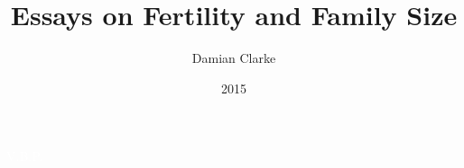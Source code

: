 \documentclass{report}[12pt]
\title{\textbf{Essays on Fertility and Family Size}}
\author{Damian Clarke}
\date{2015}
\begin{document}
\begin{spacing}{1.2}
\maketitle
\end{spacing}

\begin{spacing}{1.4}
\begin{center}
\pagestyle{empty}
\textcolor{white}{V.B.P.}\\
\vspace{5cm}
\end{center}
\end{spacing}


\tableofcontents
{}
\end{document}
